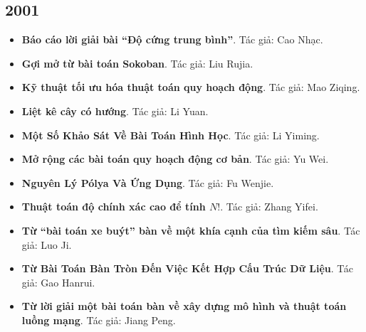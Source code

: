 \documentclass[11pt]{article}
\begin{document}
\subsection{2001}
\begin{itemize}[leftmargin=2em]
  \item \textbf{Báo cáo lời giải bài ``Độ cứng trung bình''}. Tác giả: Cao Nhạc.
  \item \textbf{Gợi mở từ bài toán Sokoban}. Tác giả: Liu Rujia.
  \item \textbf{Kỹ thuật tối ưu hóa thuật toán quy hoạch động}. Tác giả: Mao Ziqing.
  \item \textbf{Liệt kê cây có hướng}. Tác giả: Li Yuan.
  \item \textbf{Một Số Khảo Sát Về Bài Toán Hình Học}. Tác giả: Li Yiming.
  \item \textbf{Mở rộng các bài toán quy hoạch động cơ bản}. Tác giả: Yu Wei.
  \item \textbf{Nguyên Lý Pólya Và Ứng Dụng}. Tác giả: Fu Wenjie.
  \item \textbf{Thuật toán độ chính xác cao để tính \(N!\)}. Tác giả: Zhang Yifei.
  \item \textbf{Từ ``bài toán xe buýt'' bàn về một khía cạnh của tìm kiếm sâu}. Tác giả: Luo Ji.
  \item \textbf{Từ Bài Toán Bàn Tròn Đến Việc Kết Hợp Cấu Trúc Dữ Liệu}. Tác giả: Gao Hanrui.
  \item \textbf{Từ lời giải một bài toán bàn về xây dựng mô hình và thuật toán luồng mạng}. Tác giả: Jiang Peng.
\end{itemize}
\end{document}
